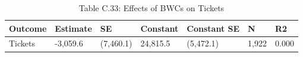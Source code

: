 \begin{table}

\caption{Table C.33: Effects of BWCs on Tickets}
\centering
\begin{tabular}[t]{lllllll}
\toprule
Outcome & Estimate & SE & Constant & Constant SE & N & R2\\
\midrule
Tickets & -3,059.6 & (7,460.1) & 24,815.5 & (5,472.1) & 1,922 & 0.000\\
\bottomrule
\end{tabular}
\end{table}
